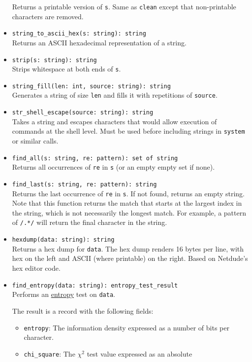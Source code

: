 \documentclass[10pt,landscape]{article}
\newcommand{\verbose}[1]{#1}
\newcommand{\verbose}[1]{}
\begin{document}
\begin{multicols*}{2}
\begin{itemize}
    Returns a printable version of \texttt{s}. Same as \texttt{clean} except
    that non-printable characters are removed.
  \item \verb|string_to_ascii_hex(s: string): string|\\
    Returns an ASCII hexadecimal representation of a string.
  \item \verb|strip(s: string): string|\\
    Strips whitespace at both ends of \texttt{s}.
  \item \verb|string_fill(len: int, source: string): string|\\
    Generates a string of size \texttt{len} and fills it with repetitions of
    \texttt{source}.
  \item \verb|str_shell_escape(source: string): string|\\
    Takes a string and escapes characters that would allow execution of
    commands at the shell level. Must be used before including strings in
    \verb|system| or similar calls.
  \item \verb|find_all(s: string, re: pattern): set of string|\\
    Returns all occurrences of \texttt{re} in \texttt{s} (or an empty empty set
    if none).
  \item \verb|find_last(s: string, re: pattern): string|\\
    Returns the last occurrence of \texttt{re} in \texttt{s}. If not found,
    returns an empty string.  Note that this function returns the match that
    starts at the largest index in the string, which is not necessarily the
    longest match.  For example, a pattern of \texttt{/.*/} will return the
    final character in the string.
  \item \verb|hexdump(data: string): string|\\
    Returns a hex dump for \texttt{data}. The hex dump renders 16 bytes per
    line, with hex on the left and ASCII (where printable) on the right. Based
    on Netdude's hex editor code.
  \item \verb|find_entropy(data: string): entropy_test_result|\\
    Performs an \href{http://www.fourmilab.ch/random/}{entropy}
    test on \verb|data|.
\verbose{
    The result is a record with the following fields:
    \begin{itemize}
      \item \verb|entropy|: The information density expressed as a number of
        bits per character.
      \item \verb|chi_square|: The $\chi^2$ test value expressed as an absolute

\end{itemize}}
\end{itemize}
\end{multicols*}
\end{document}
